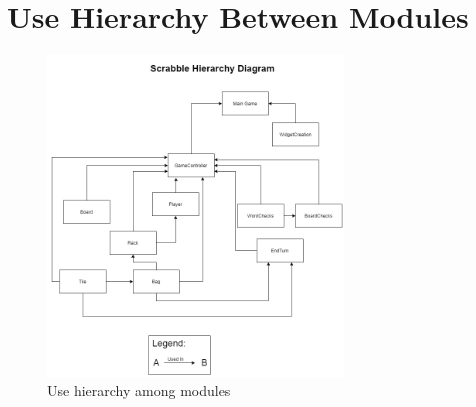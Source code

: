 \documentclass[12pt, titlepage]{article}
\begin{document}
\section{Use Hierarchy Between Modules} \label{Module Hierarchy} %

\begin{figure}[H]
\centering
\includegraphics[width=0.7\textwidth]{mg_section7_rev1.png}
\caption{Use hierarchy among modules}
\label{FigUH}
\end{figure}


\end{document}
